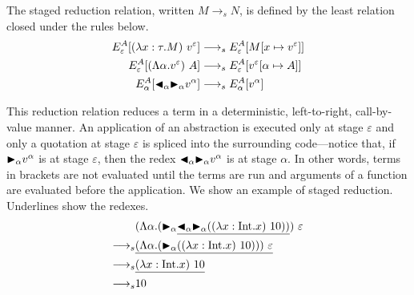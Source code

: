 \begin{definition}
  The staged reduction relation, written $M \longrightarrow_s N$, is defined by
  the least relation closed under the rules below.
  \begin{align*}
    E^A_\varepsilon [(\lambda x:\tau.M)\ v^\varepsilon] & \longrightarrow_s E^A_\varepsilon[M[x\mapsto v^\varepsilon]]      \\
    E^A_\varepsilon [(\Lambda\alpha.v^\varepsilon)\ A]  & \longrightarrow_s E^A_\varepsilon[v^\varepsilon[\alpha\mapsto A]] \\
    E^A_\alpha [{\mathop{\blacktriangleleft}}_\alpha {\mathop{\blacktriangleright}}_\alpha v^\alpha]        & \longrightarrow_s E^A_\alpha[v^\alpha]                            \\
  \end{align*}
\end{definition}

This reduction relation reduces a term in a deterministic,
left-to-right, call-by-value manner.  An application of an abstraction
is executed only at stage \(\varepsilon\) and only a quotation at
stage \(\varepsilon\) is spliced into the surrounding code---notice
that, if \({\mathop{\blacktriangleright}}_\alpha v^\alpha\) is at stage \(\varepsilon\), then the
redex \({\mathop{\blacktriangleleft}}_\alpha {\mathop{\blacktriangleright}}_\alpha v^\alpha\) is at stage \(\alpha\).
In other words, terms in brackets are not evaluated until the terms are run
and arguments of a function are evaluated before the application.
We show an example of staged reduction.
Underlines show the redexes.
\begin{align*}
                    & (\Lambda\alpha.(\TB_\alpha \underline{\TBL_\alpha \TB_\alpha ((\lambda x:\I.x)\ 10))})\ \varepsilon \\
  \longrightarrow_s & \underline{(\Lambda\alpha.(\TB_\alpha ((\lambda x:\I.x)\ 10)))\ \varepsilon}                        \\
  \longrightarrow_s & \underline{(\lambda x:\I.x)\ 10}                                                                    \\
  \longrightarrow_s & 10
\end{align*}
